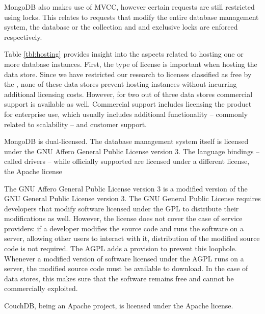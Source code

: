 MongoDB also makes use of MVCC, however certain requests are still restricted using locks.
This relates to requests that modify the entire database management system, the database or the collection and  and exclusive locks are enforced respectively.

\begin{landscape}
  
\end{landscape}

Table \ref{tbl:hosting} provides insight into the aspects related to hosting one or more database instances.
First, the type of license is important when hosting the data store.
Since we have restricted our research to licenses classified as free by the \textcite{FreeSoftwareFoundation1985}, none of these data stores prevent hosting instances without incurring additional licensing costs.
However, for two out of three data stores commercial support is available as well.
Commercial support includes licensing the product for enterprise use, which usually includes additional functionality -- commonly related to scalability -- and customer support.

MongoDB is dual-licensed.
The database management system itself is licensed under the GNU Affero General Public License version 3.
The language bindings -- called drivers -- while officially supported are licensed under a different license, the Apache license

The GNU Affero General Public License version 3 is a modified version of the GNU General Public License version 3.
The GNU General Public License requires developers that modify software licensed under the GPL to distribute their modifications as well.
However, the license does not cover the case of service providers: if a developer modifies the source code and runs the software on a server, allowing other users to interact with it, distribution of the modified source code is not required.
The AGPL adds a provision to prevent this loophole.
Whenever a modified version of software licensed under the AGPL runs on a server, the modified source code must be available to download.
In the case of data stores, this makes sure that the software remains free and cannot be commercially exploited.

CouchDB, being an Apache project, is licensed under the Apache license.

